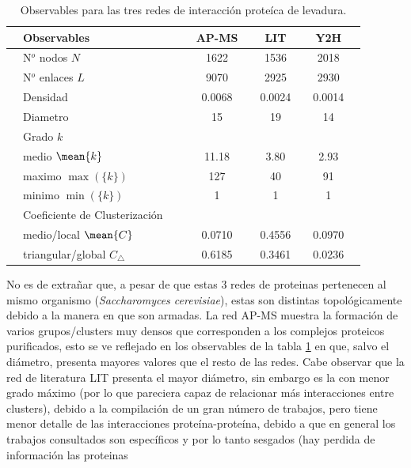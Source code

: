 \begin{table}[!ht]
    \centering
    \caption{\label{tab:obs}Observables para las tres redes de interacci\'on prote\'ica de levadura.}
    {\scriptsize
    \begin{tabularx}{1\columnwidth}{XlX|XcXcXcX}
        \hline\hline
        &Observables        &&& AP-MS && LIT && Y2H &\\ 
        \hline
        &N$^o$ nodos $N$    &&& 1622 && 1536 && 2018 &\\
        &N$^o$ enlaces $L$  &&& 9070 && 2925 && 2930 &\\
        &Densidad           &&& 0.0068 && 0.0024 && 0.0014 &\\
        &Diametro           &&& 15 && 19 && 14 &\\
        \hline
        &Grado $k$&&&\\
        &\quad medio  $\mean{k}$     &&& 11.18 && 3.80 && 2.93 &\\
        &\quad maximo $\max(\{k\})$  &&& 127  && 40   && 91 &\\ 
        &\quad minimo $\min(\{k\})$  &&& 1    && 1    && 1 &\\ 
        \hline
        &Coeficiente de Clusterizaci\'on&&&\\
        &\quad medio/local $\mean{C}$               &&& 0.0710 && 0.4556 && 0.0970 & \\
        &\quad triangular/global $C_\bigtriangleup$ &&& 0.6185 && 0.3461 && 0.0236 & \\
        \hline\hline
    \end{tabularx}
    }
\end{table}
No es de extra\~nar que, a pesar de que estas 3 redes de proteinas 
pertenecen al mismo organismo (\textit{Saccharomyces cerevisiae}),
estas son distintas topol\'ogicamente debido a la manera en que son armadas.
La red AP-MS muestra la formaci\'on de varios grupos/clusters muy densos que corresponden
a los complejos proteicos purificados, esto se ve reflejado en los observables de la tabla \ref{tab:obs}
en que, salvo el di\'ametro, presenta mayores valores que el resto de las redes. 
Cabe observar que la red de literatura LIT presenta el mayor di\'ametro, sin embargo es la con 
menor grado m\'aximo (por lo que pareciera capaz de relacionar m\'as interacciones entre clusters), debido a la compilaci\'on
de un gran n\'umero de trabajos, pero tiene menor detalle de las interacciones prote\'ina-prote\'ina, debido
a que en general los trabajos consultados son espec\'ificos y por lo tanto sesgados (hay perdida de informaci\'on las proteinas
